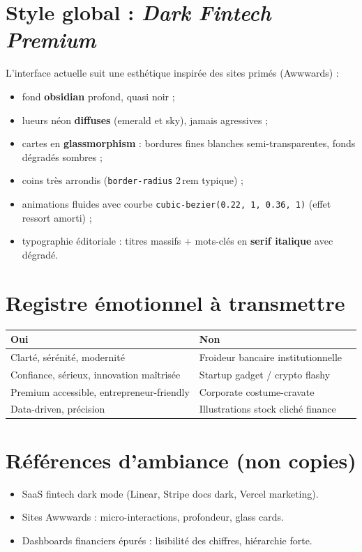 \documentclass[11pt,a4paper]{report}
\begin{document}
\section{Style global : \emph{Dark Fintech Premium}}

L'interface actuelle suit une esthétique inspirée des sites primés (Awwwards) :
\begin{itemize}[leftmargin=*]
    \item fond \textbf{obsidian} profond, quasi noir ;
    \item lueurs néon \textbf{diffuses} (emerald et sky), jamais agressives ;
    \item cartes en \textbf{glassmorphism} : bordures fines blanches semi-transparentes, fonds dégradés sombres ;
    \item coins très arrondis (\texttt{border-radius} 2\,rem typique) ;
    \item animations fluides avec courbe \texttt{cubic-bezier(0.22, 1, 0.36, 1)} (effet ressort amorti) ;
    \item typographie éditoriale : titres massifs + mots-clés en \textbf{serif italique} avec dégradé.
\end{itemize}

\section{Registre émotionnel à transmettre}

\begin{table}[h]
\centering
\begin{tabular}{@{}p{4cm}p{5cm}p{5cm}@{}}
\toprule
\textbf{Oui} & \textbf{Non} \\
\midrule
Clarté, sérénité, modernité & Froideur bancaire institutionnelle \\
Confiance, sérieux, innovation maîtrisée & Startup gadget / crypto flashy \\
Premium accessible, entrepreneur-friendly & Corporate costume-cravate \\
Data-driven, précision & Illustrations stock cliché finance \\
\bottomrule
\end{tabular}
\end{table}

\section{Références d'ambiance (non copies)}

\begin{itemize}[leftmargin=*]
    \item SaaS fintech dark mode (Linear, Stripe docs dark, Vercel marketing).
    \item Sites Awwwards : micro-interactions, profondeur, glass cards.
    \item Dashboards financiers épurés : lisibilité des chiffres, hiérarchie forte.
\end{itemize}
\end{document}
